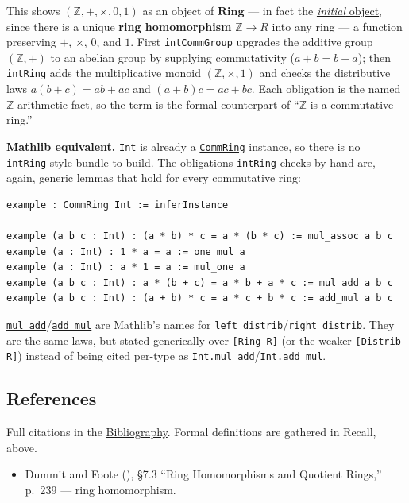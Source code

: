 \begin{mathreading}

This shows \((\mathbb{Z}, +, \times, 0, 1)\) as an object of \(\mathbf{Ring}\) --- in fact the \hyperref[sec:01-basics:04-terminology:1]{\emph{initial} object}, since there is a unique \textbf{ring homomorphism} \(\mathbb{Z} \to R\) into any ring --- a function preserving \(+\), \(\times\), \(0\), and \(1\). First \texttt{intCommGroup} upgrades the additive group \((\mathbb{Z},+)\) to an abelian group by supplying commutativity (\(a + b = b + a\)); then \texttt{intRing} adds the multiplicative monoid \((\mathbb{Z}, \times, 1)\) and checks the distributive laws \(a(b+c) = ab + ac\) and \((a+b)c = ac + bc\). Each obligation is the named \(\mathbb{Z}\)-arithmetic fact, so the term is the formal counterpart of ``\(\mathbb{Z}\) is a commutative ring.''

\end{mathreading}

\textbf{Mathlib equivalent.} \texttt{Int} is already a \href{https://loogle.lean-lang.org/?q=CommRing}{\texttt{CommRing}} instance, so there is no \texttt{intRing}-style bundle to build. The obligations \texttt{intRing} checks by hand are, again, generic lemmas that hold for every commutative ring:

\begin{lstlisting}
example : CommRing Int := inferInstance

example (a b c : Int) : (a * b) * c = a * (b * c) := mul_assoc a b c
example (a : Int) : 1 * a = a := one_mul a
example (a : Int) : a * 1 = a := mul_one a
example (a b c : Int) : a * (b + c) = a * b + a * c := mul_add a b c
example (a b c : Int) : (a + b) * c = a * c + b * c := add_mul a b c
\end{lstlisting}

\href{https://loogle.lean-lang.org/?q=mul_add}{\texttt{mul\_\allowbreak{}add}}/\href{https://loogle.lean-lang.org/?q=add_mul}{\texttt{add\_\allowbreak{}mul}} are Mathlib's names for \texttt{left\_\allowbreak{}distrib}/\texttt{right\_\allowbreak{}distrib}. They are the same laws, but stated generically over \texttt{[Ring R]} (or the weaker \texttt{[Distrib R]}) instead of being cited per-type as \texttt{Int.mul\_\allowbreak{}add}/\texttt{Int.add\_\allowbreak{}mul}.

\subsection{References}\label{sec:08-rings:04-integers-example:2}

Full citations in the \hyperref[sec:root:bibliography:1]{Bibliography}. Formal definitions are gathered in Recall, above.

\begin{itemize}
\tightlist
\item
  Dummit and Foote (\cite{DummitFoote2003}), \S7.3 ``Ring Homomorphisms and Quotient Rings,'' p.~239 --- ring homomorphism.
\end{itemize}
